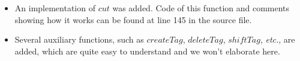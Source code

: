 \documentclass[10pt]{article}
\begin{document}
\begin{itemize}
\begin{lstlisting}
askt :: Monad m => q -> ReplayT m q r r                                                                                                                                                       
askt q = ReplayT $ \step before after ->                                                                                                                                                      
  case (items after) of                                                                                                                                                                       
    [] -> return $ (Left (q, before), step)                                                                                                                                                   
    (x:xs) -> case x of                                                                                                                                                                       
                (_, Answer r) -> return $ (Right (r, addItems before [(step, Answer r)], updateItems after xs), step)                                                                         
                _ -> fail "type mismatch, expect: Answer r, actual: Result String"
\end{lstlisting}

\item An implementation of $cut$ was added. Code of this function and comments showing how it works can be found at line 145 in the source file.

\item Several auxiliary functions, such as $createTag$, $deleteTag$, $shiftTag$, \textit{etc.}, are added, which are quite easy to understand and we won't elaborate here.
\end{itemize}
\end{document}
